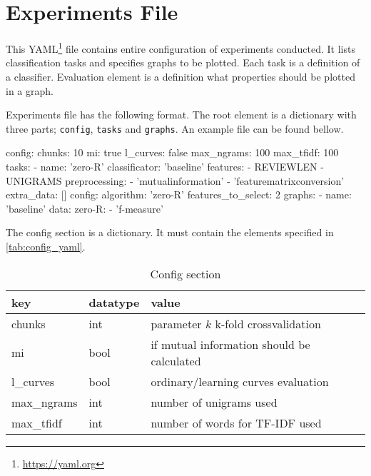 \section{Experiments File}

This YAML\footnote{\url{https://yaml.org}}  file contains entire configuration of experiments conducted.
It lists classification tasks and specifies graphs to be plotted.
Each task is a definition of a classifier.
Evaluation element is a definition what properties should be plotted in a graph.

Experiments file has the following format.
The root element is a dictionary with three parts;
\texttt{config}, \texttt{tasks} and \texttt{graphs}.
An example file can be found bellow.

\begin{code}
config:
  chunks: 10
  mi: true
  l_curves: false
  max_ngrams: 100
  max_tfidf: 100
tasks:
  - name: 'zero-R'
    classificator: 'baseline'
    features:
      - REVIEWLEN
      - UNIGRAMS
    preprocessing:
      - 'mutualinformation'
      - 'featurematrixconversion'
    extra_data: []
    config:
      algorithm: 'zero-R'
      features_to_select: 2
graphs:
  - name: 'baseline'
    data:
      zero-R:
        - 'f-measure'
\end{code}

The config section is a dictionary.
It must contain the elements specified in \autoref{tab:config_yaml}.

\begin{table}[h]
\centering
\begin{tabular}{lll}
\toprule
\textbf{key} & \textbf{datatype} & \textbf{value} \\
\midrule

chunks & int & parameter $k$  k-fold crossvalidation\\
mi & bool & if mutual information should be calculated\\
l\_curves & bool & ordinary/learning curves evaluation\\
max\_ngrams & int & number of unigrams used \\
max\_tfidf & int & number of words for TF-IDF used\\

\bottomrule
\end{tabular}

\caption{Config section}\label{tab:config_yaml}
\end{table}


